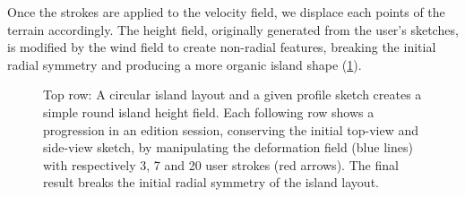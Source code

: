 Once the strokes are applied to the velocity field, we displace each points of the terrain accordingly. The height field, originally generated from the user's sketches, is modified by the wind field to create non-radial features, breaking the initial radial symmetry and producing a more organic island shape (\cref{fig:coral-island-wind-stroke-edition}).


\begin{figure} 
    \caption{Top row: A circular island layout and a given profile sketch creates a simple round island height field. Each following row shows a progression in an edition session, conserving the initial top-view and side-view sketch, by manipulating the deformation field (blue lines) with respectively 3, 7 and 20 user strokes (red arrows). The final result breaks the initial radial symmetry of the island layout. }
    \label{fig:coral-island-wind-stroke-edition}
\end{figure}





